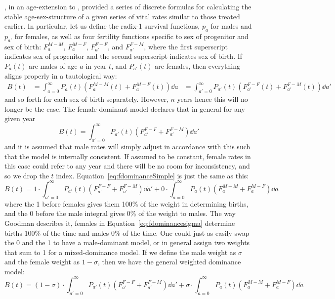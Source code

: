 \FloatBarrier
\label{sec:googmanage}
\citet{goodman1967age}, in an age-extension to \citet{goodman1953population},
provided a series of discrete formulas for calculating the
stable age-sex-structure of a given series of vital rates similar to those
treated earlier. In particular, let us define the radix-1 survival functions,
$p_a$ for males and $p_{a'}$ for females, as well as four fertility
functions specific to sex of progenitor and sex of birth:
$F_a^{M-M}$, $F_a^{M-F}$, $F_{a'}^{F-F}$, and  $F_{a'}^{F-M}$, where the first
superscript indicates sex of progenitor and the second superscript indicates sex
of birth. If $P_a(t)$ are males of age $a$ in year $t$, and $P_{a'}(t)$ are
females, then everything aligns properly in a tautological way:
\begin{align}
B(t) &= \int_{a=0}^\infty P_a(t) (F_a^{M-M}(t)+F_a^{M-F}(t)) \dd a
     &= \int_{a'=0}^\infty P_{a'}(t) (F_{a'}^{F-F}(t)+F_{a'}^{F-M}(t)) \dd a'
\end{align}
and so forth for each sex of birth separately. However, $n$ years hence this
will no longer be the case. The female dominant model declares that in general
for any given year
\begin{equation}
\label{eq:fdominanceSimple}
B(t) = \int_{a'=0}^\infty P_{a'}(t) (F_{a'}^{F-F}+F_{a'}^{F-M}) \dd a'
\end{equation}
and it is assumed that male rates will simply adjust in accordance with this
such that the model is internally consistent. If assumed  to be constant, female
rates in this case could refer to any year and there will be no room for
inconsistency, and so we drop the $t$ index.
Equation~\eqref{eq:fdominanceSimple} is just the same as this:
\begin{equation}
\label{eq:fdominancesigma}
B(t) = 1 \cdot \int_{a'=0}^\infty P_{a'}(t) (F_{a'}^{F-F}+F_{a'}^{F-M}) \dd a' +
       0 \cdot \int_{a=0}^\infty P_a(t) (F_a^{M-M}+F_a^{M-F}) \dd a
\end{equation}
where the 1 before females gives them 100\% of the weight in determining births,
and the 0 before the male integral gives 0\% of the weight to males. The way
Goodman describes it, females in Equation~\ref{eq:fdominancesigma} determine
births 100\% of the time and males 0\% of the time. One could just as easily
swap the 0 and the 1 to have a male-dominant model, or in general assign two
weights that sum to 1 for a mixed-dominance model. If we define the male weight
as $\sigma$ and the female weight as $1-\sigma$, then we have the general
weighted dominance model:
\begin{equation}
\label{eq:dominancesigma}
B(t) = (1-\sigma) \cdot \int_{a'=0}^\infty P_{a'}(t) (F_{a'}^{F-F}+F_{a'}^{F-M})
\dd a' + \sigma \cdot \int_{a=0}^\infty P_a(t) (F_a^{M-M}+F_a^{M-F}) \dd a
\end{equation}
